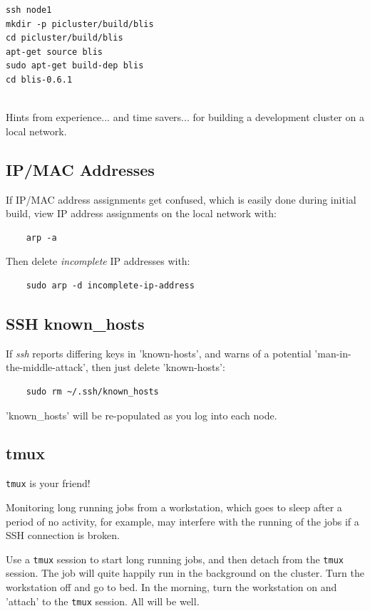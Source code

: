 \documentclass{article}
\begin{document}
\begin{lstlisting}[]
ssh node1
mkdir -p picluster/build/blis
cd picluster/build/blis
apt-get source blis
sudo apt-get build-dep blis
cd blis-0.6.1


\end{lstlisting}








Hints from experience... and time savers... for building a development cluster on a local network.

\subsection{IP/MAC Addresses}
If IP/MAC address assignments get confused, which is easily done during initial build, view IP address assignments on the local network with:

\begin{verbatim}
    arp -a
\end{verbatim}

Then delete \emph{incomplete} IP addresses with:

\begin{verbatim}
    sudo arp -d incomplete-ip-address
\end{verbatim}

\subsection{SSH known\_hosts}
If \emph{ssh} reports differing keys in 'known-hosts', and warns of a potential 'man-in-the-middle-attack', then just delete 'known-hosts':

\begin{verbatim}
    sudo rm ~/.ssh/known_hosts
\end{verbatim}

'known\_hosts' will be re-populated as you log into each node. 


\subsection{tmux}
\verb|tmux| is your friend!

Monitoring long running jobs from a workstation, which goes to sleep after a period of no activity, for example, may interfere with the running of the jobs if a SSH connection is broken.

Use a \verb|tmux| session to start long running jobs, and then detach from the \verb|tmux| session. The job will quite happily run in the background on the cluster. Turn the workstation off and go to bed. In the morning, turn the workstation on and 'attach' to the \verb|tmux| session. All will be well.
\end{document}
